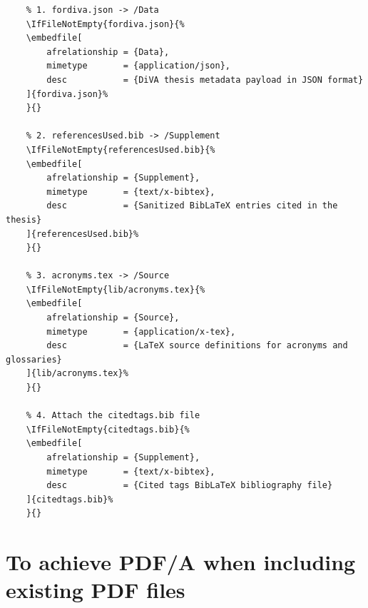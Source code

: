 \documentclass[12pt, twoside]{article}
\begin{document}
\begin{lstlisting}[language={[LaTeX]TeX}, caption={Embedding auxiliary payload files in \texttt{examplethesis.tex}}, label=lst:embeddingAuxFiles]
% add the various files to be embedded
    % 1. fordiva.json -> /Data
    \IfFileNotEmpty{fordiva.json}{%
    \embedfile[
        afrelationship = {Data},
        mimetype       = {application/json},
        desc           = {DiVA thesis metadata payload in JSON format}
    ]{fordiva.json}%
    }{}
    
    % 2. referencesUsed.bib -> /Supplement
    \IfFileNotEmpty{referencesUsed.bib}{%
    \embedfile[
        afrelationship = {Supplement},
        mimetype       = {text/x-bibtex},
        desc           = {Sanitized BibLaTeX entries cited in the thesis}
    ]{referencesUsed.bib}%
    }{}
    
    % 3. acronyms.tex -> /Source
    \IfFileNotEmpty{lib/acronyms.tex}{%
    \embedfile[
        afrelationship = {Source},
        mimetype       = {application/x-tex},
        desc           = {LaTeX source definitions for acronyms and glossaries}
    ]{lib/acronyms.tex}%
    }{}
    
    % 4. Attach the citedtags.bib file
    \IfFileNotEmpty{citedtags.bib}{%
    \embedfile[
        afrelationship = {Supplement},
        mimetype       = {text/x-bibtex},
        desc           = {Cited tags BibLaTeX bibliography file}
    ]{citedtags.bib}%
    }{}
\end{lstlisting}

\clearpage
\section{To achieve PDF/A when including existing PDF files}
\label{sec:PDFAforExistingPDFs}
\end{document}
